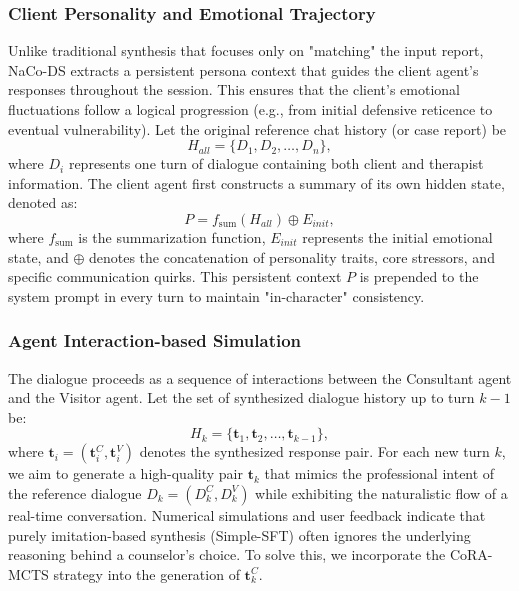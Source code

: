 \documentclass[lettersize,journal]{IEEEtran}
\begin{document}
\subsubsection{Client Personality and Emotional Trajectory}
Unlike traditional synthesis that focuses only on "matching" the input report, NaCo-DS extracts a persistent persona context that guides the client agent's responses throughout the session. This ensures that the client's emotional fluctuations follow a logical progression (e.g., from initial defensive reticence to eventual vulnerability).
Let the original reference chat history (or case report) be
\begin{equation}
H_{all} = \{D_{1}, D_{2}, \dots , D_{n}\},
\end{equation}
where $D_{i}$ represents one turn of dialogue containing both client and therapist information. 
The client agent first constructs a summary of its own hidden state, denoted as:
\begin{equation}
P = f_{\text{sum}}(H_{all}) \oplus E_{init},
\end{equation}
where $f_{\text{sum}}$ is the summarization function, $E_{init}$ represents the initial emotional state, and $\oplus$ denotes the concatenation of personality traits, core stressors, and specific communication quirks. This persistent context $P$ is prepended to the system prompt in every turn to maintain "in-character" consistency.

\subsubsection{Agent Interaction-based Simulation}
The dialogue proceeds as a sequence of interactions between the Consultant agent and the Visitor agent. Let the set of synthesized dialogue history up to turn $k-1$ be:
\begin{equation}
H_{k} = \{\mathbf{t}_{1}, \mathbf{t}_{2}, \dots , \mathbf{t}_{k - 1}\},
\end{equation}
where $\mathbf{t}_i = (\mathbf{t}_{i}^{C}, \mathbf{t}_{i}^{V})$ denotes the synthesized response pair. 
For each new turn $k$, we aim to generate a high-quality pair $\mathbf{t}_k$ that mimics the professional intent of the reference dialogue $D_k = (D_k^C, D_k^V)$ while exhibiting the naturalistic flow of a real-time conversation.
Numerical simulations and user feedback indicate that purely imitation-based synthesis (Simple-SFT) often ignores the underlying reasoning behind a counselor's choice. To solve this, we incorporate the CoRA-MCTS strategy into the generation of $\mathbf{t}_k^C$.
\end{document}
